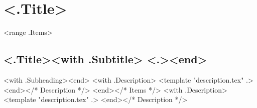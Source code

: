 \section{<.Title>}
<range .Items>
\subsection{\textbf{<.Title>}<with .Subtitle> <.><end>}
<with .Subheading><end>
<with .Description>
<template "description.tex" .>
<end></* Description */>
<end></* Items */>
<with .Description>
<template "description.tex" .>
<end></* Description */>
